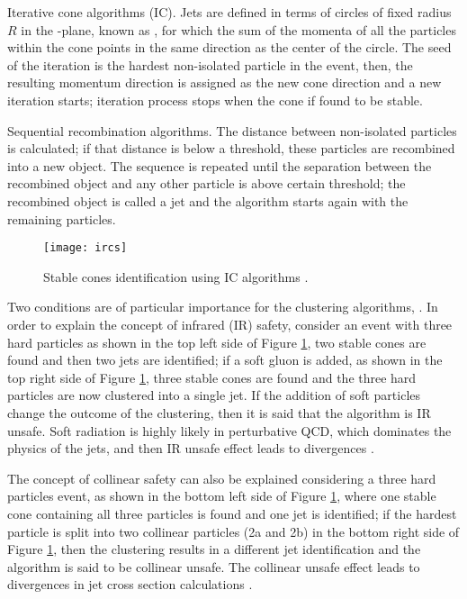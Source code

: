 \bit
\item Iterative cone algorithms (IC). Jets are defined in terms of circles of fixed radius $R$ in the \etac-\phic plane, known as , for which the sum of the momenta of all the particles within the cone points in the same direction as the center of the circle. The seed of the iteration is the hardest non-isolated particle in the event, then, the resulting momentum direction is assigned as the new cone direction and a new iteration starts; iteration process stops when the cone if found to be stable. 
\item Sequential recombination algorithms. The distance between non-isolated particles is calculated; if that distance is below a threshold, these particles are recombined into a new object. The sequence is repeated until the separation between the recombined object and any other particle is above certain threshold; the recombined object is called a jet and the algorithm starts again with the remaining particles.      
\eit

\begin{figure}[!h]
  \centering
  \texttt{[image: ircs]}
  \caption[Stable cones identification]{Stable cones identification using IC algorithms \cite{coco}.}\label{fig:irc}
\end{figure}

Two conditions are of particular importance for the clustering algorithms, . In order to explain the concept of infrared (IR) safety, consider an event with three hard particles as shown in the top left side of Figure \ref{fig:irc}, two stable cones are found and then two jets are identified; if a soft gluon is added, as shown in the top right side of Figure \ref{fig:irc}, three stable cones are found and the three hard particles are now clustered into a single jet. If the addition of soft particles change the outcome of the clustering, then it is said that the algorithm is IR unsafe. Soft radiation is highly likely in perturbative QCD, which dominates the physics of the jets, and then IR unsafe effect leads to divergences \cite{coco}.

The concept of collinear safety can also be explained considering a three hard particles event, as shown in the bottom left side of Figure \ref{fig:irc}, where one stable cone containing all three particles is found and one jet is identified; if the hardest particle is split into two collinear particles (2a and 2b) in the bottom right side of Figure \ref{fig:irc}, then the clustering results in a different jet identification and the algorithm is said to be collinear unsafe. The collinear unsafe effect leads to divergences in jet cross section calculations \cite{antikt}.       

